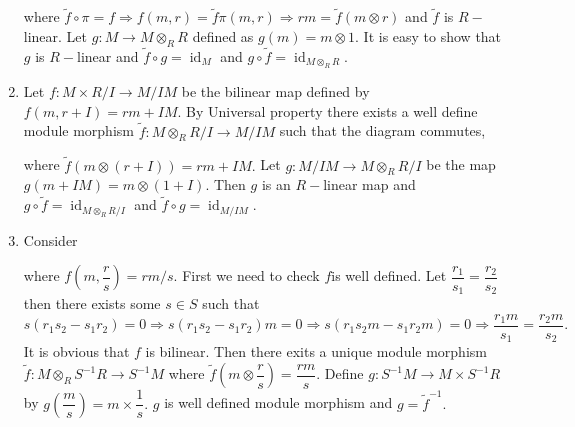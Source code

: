 \documentclass[11pt]{amsart}
\DeclareMathOperator{\id}{\text{id}}
\begin{document}
\begin{enumerate}
where $\tilde{f}\circ \pi=f \Rightarrow f(m,r)=\tilde{f}\pi(m,r) \Rightarrow rm=\tilde{f}(m\otimes r)$ and $\tilde{f}$ is $R-$linear. Let $g:M\to M\otimes_R R$ defined as $g(m)=m\otimes 1.$ It is easy to show that $g$ is $R-$linear and $\tilde{f}\circ g=\id_{M}$ and $g\circ \tilde{f}=\id_{M\otimes_R R}.$

\item Let $f:M\times R/I\to M/IM$ be the bilinear map defined by $f(m,r+I)=rm+IM.$ By Universal property there exists a well define module morphism $\tilde{f}:M\otimes_R R/I\to M/IM$ such that the diagram commutes, 

\begin{center}
\end{center}

where $\tilde{f}(m\otimes (r+I))=rm+IM.$ Let $g:M/IM\to M\otimes_R R/I$ be the map $g(m+IM)=m\otimes (1+I)$. Then $g$ is an $R-$linear map and $g\circ \tilde{f}=\id_{M\otimes_R R/I}$ and $\tilde{f}\circ g=\id_{M/IM}.$

\item Consider \begin{center}
\end{center}

where $f\left(m,\dfrac{r}{s}\right)=rm/s.$ First we need to check $f$is well defined. Let $\dfrac{r_1}{s_1}=\dfrac{r_2}{s_2}$ then there exists some $s\in S$ such that $s(r_1s_2-s_1r_2)=0 \Rightarrow s(r_1s_2-s_1r_2)m=0\Rightarrow s(r_1s_2m-s_1r_2m)=0 \Rightarrow \dfrac{r_1m}{s_1}=\dfrac{r_2m}{s_2}.$ It is obvious that $f$ is bilinear. Then there exits a unique module morphism $\tilde{f}:M\otimes_R S^{-1}R \to S^{-1}M$ where $\tilde{f}\left(m\otimes \dfrac{r}{s}\right)=\dfrac{rm}{s}.$ Define $g:S^{-1}M\to M\times S^{-1}R$ by $g\left(\dfrac{m}{s}\right)=m\times \dfrac{1}{s}.$ $g$ is well defined module morphism and $g=\tilde{f}^{-1}.$


\end{enumerate}
\end{document}

